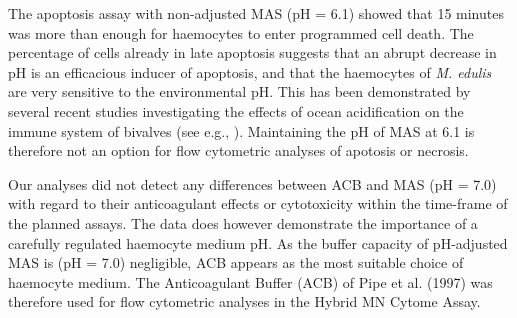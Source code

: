 The apoptosis assay with non-adjusted MAS (pH = 6.1) showed that 15 minutes was more than enough for haemocytes to enter programmed cell death. The percentage of cells already in late apoptosis suggests that an abrupt decrease in pH is an efficacious inducer of apoptosis, and that the haemocytes of \emph{M. edulis} are very sensitive to the environmental pH. This has been demonstrated by several recent studies investigating the effects of ocean acidification on the immune system of bivalves (see e.g., \cite{Wang2016, Dang2023}). Maintaining the pH of MAS at 6.1 is therefore not an option for flow cytometric analyses of apotosis or necrosis.

Our analyses did not detect any differences between ACB and MAS (pH = 7.0) with regard to their anticoagulant effects or cytotoxicity within the time-frame of the planned assays. The data does however demonstrate the importance of a carefully regulated haemocyte medium pH. As the buffer capacity of pH-adjusted MAS is (pH = 7.0) negligible, ACB appears as the most suitable choice of haemocyte medium. The Anticoagulant Buffer (ACB) of Pipe et al. (1997) was therefore used for flow cytometric analyses in the Hybrid MN Cytome Assay.
